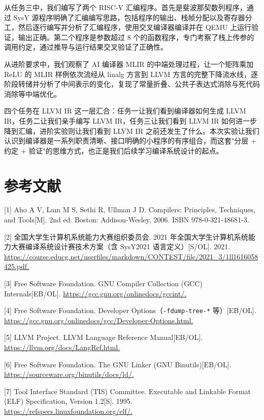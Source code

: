 \documentclass[UTF8,a4paper,10pt]{ctexart}
\begin{document}
从任务三中，我们编写了两个 RISC-V 汇编程序。首先是斐波那契数列程序，通过 SysY 源程序明确了汇编编写思路，包括程序的输出、栈帧分配以及寄存器分工，然后逐行编写并分析了汇编程序，使用交叉编译器编译并在 QEMU 上运行验证，输出正确。第二个程序是参数超过 8 个的函数程序，专门考察了栈上传参的调用约定，通过推导与运行结果交叉验证了正确性。

从进阶要求中，我们观察了 AI 编译器 MLIR 的中端处理过程，让一个矩阵乘加 ReLU 的 MLIR 样例依次流经从 linalg 方言到 LLVM 方言的完整下降流水线，逐阶段转储并分析了中间表示的变化，复现了常量折叠、公共子表达式消除与死代码消除等中端优化。

四个任务在 LLVM IR 这一层汇合：任务一让我们看到编译器如何生成 LLVM IR，任务二让我们亲手编写 LLVM IR，任务三让我们看到 LLVM IR 如何进一步降到汇编，进阶实验则让我们看到 LLVM IR 之前还发生了什么。本次实验让我们认识到编译器是一系列职责清晰、接口明确的小程序的有序组合，而这套"分层 + 约定 + 验证"的思维方式，也正是我们后续学习编译系统设计的起点。

\newpage

\newpage
\section{参考文献}



[1] Aho A V, Lam M S, Sethi R, Ullman J D. Compilers: Principles, Techniques, and Tools[M]. 2nd ed. Boston: Addison-Wesley, 2006. ISBN 978-0-321-48681-3.

[2] 全国大学生计算机系统能力大赛组织委员会. 2021 年全国大学生计算机系统能力大赛编译系统设计赛技术方案（含 SysY2021 语言定义）[S/OL]. 2021. \url{https://course.educg.net/userfiles/markdown/CONTEST/file/2021_3/1ll1616058425.pdf.}


[3] Free Software Foundation. GNU Compiler Collection (GCC) Internals[EB/OL]. \url{https://gcc.gnu.org/onlinedocs/gccint/.}

[4] Free Software Foundation. Developer Options（\texttt{-fdump-tree-*} 等）[EB/OL]. \url{https://gcc.gnu.org/onlinedocs/gcc/Developer-Options.html.}

[5] LLVM Project. LLVM Language Reference Manual[EB/OL]. \url{https://llvm.org/docs/LangRef.html.}


[6] Free Software Foundation. The GNU Linker (GNU Binutils)[EB/OL]. \url{https://sourceware.org/binutils/docs/ld/.}

[7] Tool Interface Standard (TIS) Committee. Executable and Linkable Format (ELF) Specification, Version 1.2[S]. 1995. \url{https://refspecs.linuxfoundation.org/elf/.}
\end{document}
